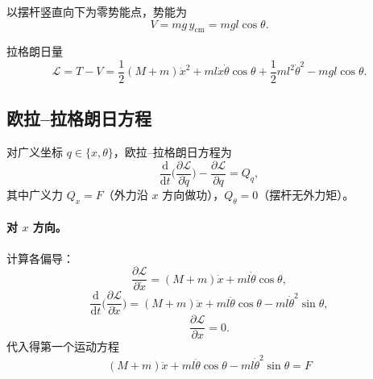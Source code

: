 \documentclass[11pt,a4paper]{article}
\begin{document}
以摆杆竖直向下为零势能点，势能为
\begin{equation}
    V = m g\, y_{\mathrm{cm}} = m g l \cos\theta .
\end{equation}

拉格朗日量
\begin{equation}
    \mathcal{L} = T - V = \frac{1}{2}(M+m)\dot x^2 + ml\dot x\dot\theta\cos\theta + \frac{1}{2}ml^2\dot\theta^2 - mgl\cos\theta .
\end{equation}

\subsection{欧拉--拉格朗日方程}

对广义坐标 $q \in \{x, \theta\}$，欧拉--拉格朗日方程为
\begin{equation}
    \frac{\mathrm d}{\mathrm dt}\Big(\frac{\partial \mathcal L}{\partial \dot q}\Big) - \frac{\partial \mathcal L}{\partial q} = Q_q ,
\end{equation}
其中广义力 $Q_x = F$（外力沿 $x$ 方向做功），$Q_\theta = 0$（摆杆无外力矩）。

\paragraph{对 \texorpdfstring{$x$}{x} 方向。} 计算各偏导：
\begin{equation}
    \frac{\partial \mathcal L}{\partial \dot x} = (M+m)\dot x + ml\dot\theta\cos\theta ,
\end{equation}
\begin{equation}
    \frac{\mathrm d}{\mathrm dt}\Big(\frac{\partial \mathcal L}{\partial \dot x}\Big)
    = (M+m)\ddot x + ml\ddot\theta\cos\theta - ml\dot\theta^2\sin\theta ,
\end{equation}
\begin{equation}
    \frac{\partial \mathcal L}{\partial x} = 0 .
\end{equation}
代入得第一个运动方程
\begin{equation}
    \boxed{\; (M+m)\ddot x + ml\ddot\theta\cos\theta - ml\dot\theta^2\sin\theta = F \;}
    \label{eq:eom1}
\end{equation}
\end{document}
